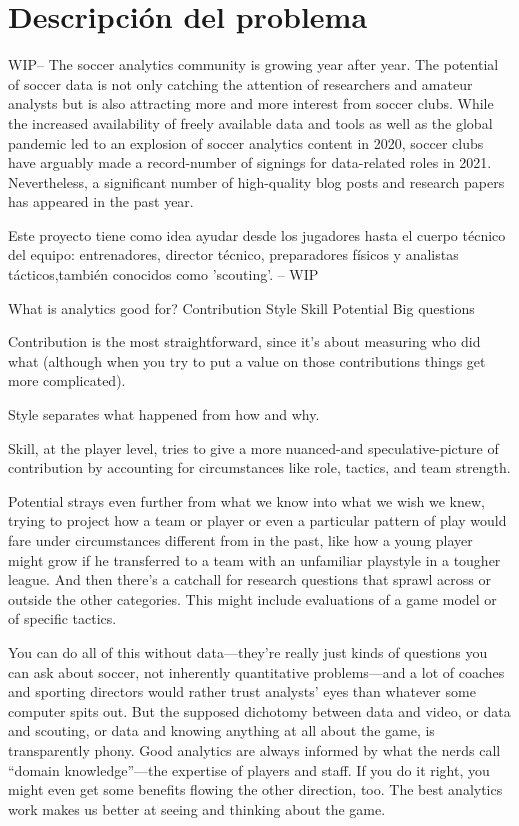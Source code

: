 \chapter{Descripción del problema}

 WIP--
The soccer analytics community is growing year after year. The potential 
of soccer data is not only catching the attention of researchers and 
amateur analysts but is also attracting more and more interest from 
soccer clubs. While the increased availability of freely available 
data and tools as well as the global pandemic led to an explosion of 
soccer analytics content in 2020, soccer clubs have arguably made a 
record-number of signings for data-related roles in 2021. Nevertheless, 
a significant number of high-quality blog posts and research papers has 
appeared in the past year. 

Este proyecto tiene como idea ayudar desde los jugadores hasta 
el cuerpo técnico del equipo: entrenadores, director técnico, preparadores 
físicos y analistas tácticos,también conocidos como 'scouting'.
-- WIP 

What is analytics good for?
Contribution
Style
Skill
Potential
Big questions

Contribution is the most straightforward, since it’s about measuring who 
did what (although when you try to put a value on those contributions 
things get more complicated). 

Style separates what happened from how and why.

Skill, at the player level, tries to give a more nuanced-and 
speculative-picture of contribution by accounting for circumstances 
like role, tactics, and team strength. 

Potential strays even further from what we know into what we wish we 
knew, trying to project how a team or player or even a particular 
pattern of play would fare under circumstances different from in the 
past, like how a young player might grow if he transferred to a team 
with an unfamiliar playstyle in a tougher league. And then there’s 
a catchall for research questions that sprawl across or outside 
the other categories. This might include evaluations of a game 
model or of specific tactics.

You can do all of this without data—they’re really just kinds 
of questions you can ask about soccer, not inherently quantitative 
problems—and a lot of coaches and sporting directors would rather 
trust analysts’ eyes than whatever some computer spits out. But 
the supposed dichotomy between data and video, or data and scouting, 
or data and knowing anything at all about the game, is transparently 
phony. Good analytics are always informed by what the nerds call 
“domain knowledge”—the expertise of players and staff. If you do it 
right, you might even get some benefits flowing the other direction, too. 
The best analytics work makes us better at seeing and thinking about the game.

